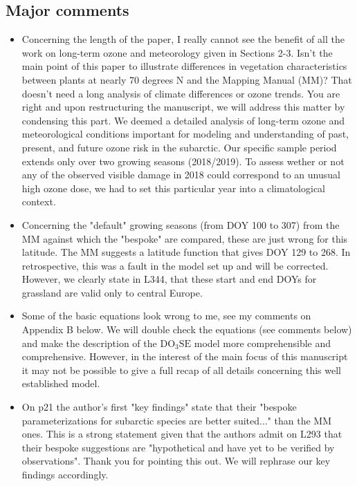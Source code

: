 \documentclass{scrartcl}
\begin{document}
\subsection*{Major comments} 
\begin{itemize}
    
    \item {\color{blue}Concerning the length of the paper, I really cannot see the benefit of all the work on long-term ozone and meteorology given in Sections 2-3. Isn't the main point of this paper to illustrate differences in vegetation characteristics between plants at nearly 70 degrees N and the Mapping Manual (MM)? That doesn't need a long analysis of climate differences or ozone trends.}
    You are right and upon restructuring the manuscript, we will address this matter by condensing this part. We deemed a detailed analysis of long-term ozone and meteorological conditions important for modeling and understanding of past, present, and future ozone risk in the subarctic. Our specific sample period extends only over two growing seasons (2018/2019). To assess wether or not any of the observed visible damage in 2018 could correspond to an unusual high ozone dose, we had to set this particular year into a climatological context. 
    
    \item {\color{blue}Concerning the "default" growing seasons (from DOY 100 to 307) from the MM against which the "bespoke" are compared, these are just wrong for this latitude. The MM suggests a latitude function that gives DOY 129 to 268.}
    In retrospective, this was a fault in the model set up and will be corrected. However, we clearly state in L344, that these start and end DOYs for grassland are valid only to central Europe.
    
    \item {\color{blue}Some of the basic equations look wrong to me, see my comments on Appendix B below.}
    We will double check the equations (see comments below) and make the description of the $\mathrm{DO_3SE}$ model more comprehensible and comprehensive. However, in the interest of the main focus of this manuscript it may not be possible to give a full recap of all details concerning this well established model.
    
    \item {\color{blue}On p21 the author's first "key findings" state that their "bespoke parameterizations for subarctic species are better suited..." than the MM ones. This is a strong statement given that the authors admit on L293 that their bespoke suggestions are "hypothetical and have yet to be verified by observations".}
    Thank you for pointing this out. We will rephrase our key findings accordingly.

\end{itemize}
\end{document}
